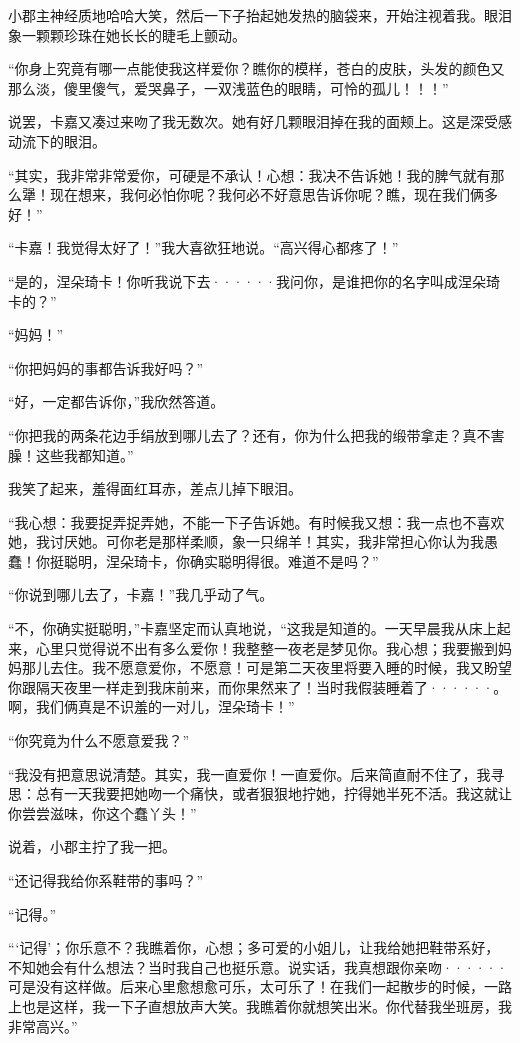 \documentclass[12pt, UTF8]{ctexbook}
\begin{document}
\par 小郡主神经质地哈哈大笑，然后一下子抬起她发热的脑袋来，开始注视着我。眼泪象一颗颗珍珠在她长长的睫毛上颤动。
\par “你身上究竟有哪一点能使我这样爱你？瞧你的模样，苍白的皮肤，头发的颜色又那么淡，傻里傻气，爱哭鼻子，一双浅蓝色的眼睛，可怜的孤儿！！！”
\par 说罢，卡嘉又凑过来吻了我无数次。她有好几颗眼泪掉在我的面颊上。这是深受感动流下的眼泪。
\par “其实，我非常非常爱你，可硬是不承认！心想：我决不告诉她！我的脾气就有那么犟！现在想来，我何必怕你呢？我何必不好意思告诉你呢？瞧，现在我们俩多好！”
\par “卡嘉！我觉得太好了！”我大喜欲狂地说。“高兴得心都疼了！”
\par “是的，涅朵琦卡！你听我说下去······我问你，是谁把你的名字叫成涅朵琦卡的？”
\par “妈妈！”
\par “你把妈妈的事都告诉我好吗？”
\par “好，一定都告诉你，”我欣然答道。
\par “你把我的两条花边手绢放到哪儿去了？还有，你为什么把我的缎带拿走？真不害臊！这些我都知道。”
\par 我笑了起来，羞得面红耳赤，差点儿掉下眼泪。
\par “我心想：我要捉弄捉弄她，不能一下子告诉她。有时候我又想：我一点也不喜欢她，我讨厌她。可你老是那样柔顺，象一只绵羊！其实，我非常担心你认为我愚蠢！你挺聪明，涅朵琦卡，你确实聪明得很。难道不是吗？”
\par “你说到哪儿去了，卡嘉！”我几乎动了气。
\par “不，你确实挺聪明，”卡嘉坚定而认真地说，“这我是知道的。一天早晨我从床上起来，心里只觉得说不出有多么爱你！我整整一夜老是梦见你。我心想；我要搬到妈妈那儿去住。我不愿意爱你，不愿意！可是第二天夜里将要入睡的时候，我又盼望你跟隔天夜里一样走到我床前来，而你果然来了！当时我假装睡着了······。啊，我们俩真是不识羞的一对儿，涅朵琦卡！”
\par “你究竟为什么不愿意爱我？”
\par “我没有把意思说清楚。其实，我一直爱你！一直爱你。后来简直耐不住了，我寻思：总有一天我要把她吻一个痛快，或者狠狠地拧她，拧得她半死不活。我这就让你尝尝滋味，你这个蠢丫头！”
\par 说着，小郡主拧了我一把。
\par “还记得我给你系鞋带的事吗？”
\par “记得。”
\par “‘记得’；你乐意不？我瞧着你，心想；多可爱的小姐儿，让我给她把鞋带系好，不知她会有什么想法？当时我自己也挺乐意。说实话，我真想跟你亲吻······可是没有这样做。后来心里愈想愈可乐，太可乐了！在我们一起散步的时候，一路上也是这样，我一下子直想放声大笑。我瞧着你就想笑出米。你代替我坐班房，我非常高兴。”
\end{document}
